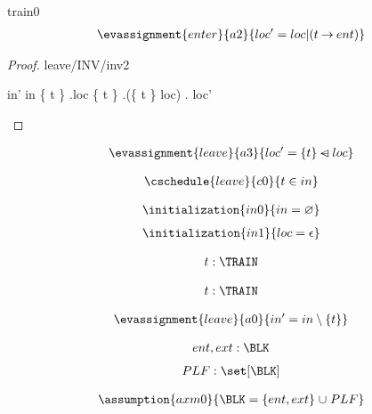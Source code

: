 \documentclass[12pt]{amsart}
\begin{document}
\begin{machine}{train0}
\begin{align*}
\evassignment{enter}{a2}
{	loc' = loc | (t \fun ent)	}
\end{align*}

\begin{proof}{leave/INV/inv2}
	\begin{calculation}
		in'
	\hint{=}{ \ref{a0} }
		in \setminus \{ t \}
	\hint{=}{ \ref{inv2} }
		\dom.loc \setminus \{ t \}
		\dom.(\{ t \} \domsub loc)
	\hint{=}{ \ref{a3} } 
		\dom. loc' 
	\end{calculation}
\end{proof}

\begin{align*}
\evassignment{leave}{a3}
{	loc' = \{ t \} \domsub loc 	}
\end{align*}

\begin{align*}
\cschedule{leave}{c0}
{	t \in in	}
\end{align*}

\begin{align*}
\initialization{in0}
{	in = \emptyset	}
\end{align*}
\begin{align*}
\initialization{in1}
{	loc = \emptyfun	}
\end{align*}


\begin{align*}
\indices{leave}{	t: \TRAIN}
\end{align*}

\begin{align*}
\indices{enter}{	t: \TRAIN}
\end{align*}

\begin{align*}
\evassignment{leave}{a0}
{	in' = in \setminus \{ t \}	}
\end{align*}

\begin{align*}
\constant{	ent,ext : \BLK}
\end{align*}
\begin{align*}
\constant{	PLF : \set [\BLK]}
\end{align*}

\begin{align*}\assumption{axm0}
{	\BLK = \{ ent, ext \} \bunion PLF }
\end{align*}


\end{machine}
\end{document}
